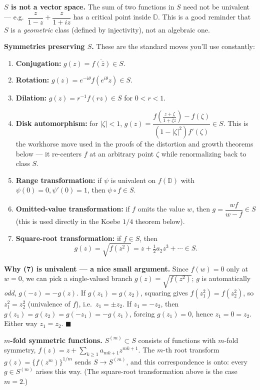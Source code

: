 \documentclass[
]{book}
\providecommand{\tightlist}{%
  \setlength{\itemsep}{0pt}\setlength{\parskip}{0pt}}
\theoremstyle{definition}
\theoremstyle{definition}
\theoremstyle{definition}
\theoremstyle{definition}
\theoremstyle{remark}
\begin{document}
\textbf{\(S\) is not a vector space.} The sum of two functions in \(S\) need not be univalent --- e.g.~\(\dfrac{z}{1-z} + \dfrac{z}{1+iz}\) has a critical point inside \(\mathbb D\). This is a good reminder that \(S\) is a \emph{geometric} class (defined by injectivity), not an algebraic one.

\textbf{Symmetries preserving \(S\).} These are the standard moves you'll use constantly:

\begin{enumerate}
\def\labelenumi{\arabic{enumi}.}
\tightlist
\item
  \textbf{Conjugation:} \(g(z) = \overline{f(\bar z)} \in S\).
\item
  \textbf{Rotation:} \(g(z) = e^{-i\theta}f(e^{i\theta}z) \in S\).
\item
  \textbf{Dilation:} \(g(z) = r^{-1}f(rz) \in S\) for \(0<r<1\).
\item
  \textbf{Disk automorphism:} for \(|\zeta|<1\), \(g(z) = \dfrac{f\!\left(\frac{z+\zeta}{1+\bar\zeta z}\right) - f(\zeta)}{(1-|\zeta|^2)f'(\zeta)} \in S\). This is the workhorse move used in the proofs of the distortion and growth theorems below --- it re-centers \(f\) at an arbitrary point \(\zeta\) while renormalizing back to class \(S\).
\item
  \textbf{Range transformation:} if \(\psi\) is univalent on \(f(\mathbb D)\) with \(\psi(0)=0,\psi'(0)=1\), then \(\psi\circ f \in S\).
\item
  \textbf{Omitted-value transformation:} if \(f\) omits the value \(w\), then \(g = \dfrac{wf}{w-f} \in S\) (this is used directly in the Koebe \(1/4\) theorem below).
\item
  \textbf{Square-root transformation:} if \(f\in S\), then
  \[g(z) = \sqrt{f(z^2)} = z + \tfrac12 a_2 z^3 + \cdots \in S.\]
\end{enumerate}

\textbf{Why (7) is univalent --- a nice small argument.} Since \(f(w)=0\) only at \(w=0\), we can pick a single-valued branch \(g(z) = \sqrt{f(z^2)}\); \(g\) is automatically \emph{odd}, \(g(-z)=-g(z)\). If \(g(z_1)=g(z_2)\), squaring gives \(f(z_1^2)=f(z_2^2)\), so \(z_1^2=z_2^2\) (univalence of \(f\)), i.e.~\(z_1 = \pm z_2\). If \(z_1=-z_2\), then \(g(z_1) = g(z_2) = g(-z_1) = -g(z_1)\), forcing \(g(z_1)=0\), hence \(z_1=0=z_2\). Either way \(z_1=z_2\). \(\blacksquare\)

\textbf{\(m\)-fold symmetric functions.} \(S^{(m)}\subset S\) consists of functions with \(m\)-fold symmetry, \(f(z) = z + \sum_{k\ge1} a_{mk+1}z^{mk+1}\). The \(m\)-th root transform \(g(z) = \{f(z^m)\}^{1/m}\) sends \(S \to S^{(m)}\), and this correspondence is onto: every \(g\in S^{(m)}\) arises this way. (The square-root transformation above is the case \(m=2\).)
\end{document}
